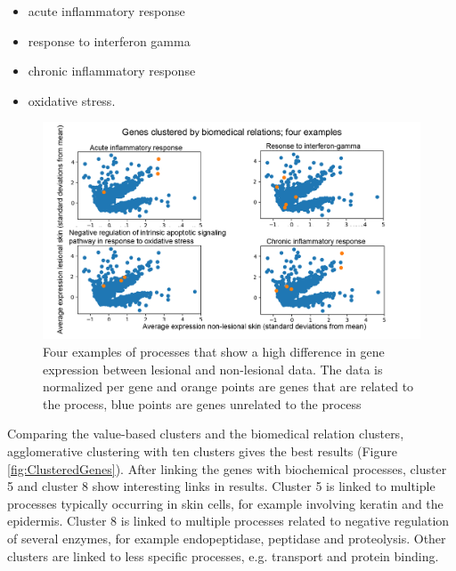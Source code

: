\documentclass[10pt,a4paper]{report}
\begin{document}
	\begin{itemize}
		\item acute inflammatory response
		\item response to interferon gamma 
		\item chronic inflammatory response
		\item oxidative stress.
	\end{itemize}
	
	\begin{figure}[H]
		\includegraphics[width=1\textwidth]{Sign_Processes_Psoriasis.png}
		\caption{Four examples of processes that show a high difference in gene expression between lesional and non-lesional data. The data is normalized per gene and orange points are genes that are related to the process, blue points are genes unrelated to the process}
		\label{fig:ProcessesScaledBySample}
	\end{figure}	
	
	Comparing the value-based clusters and the biomedical relation clusters, agglomerative clustering with ten clusters gives the best results (Figure \ref{fig:ClusteredGenes}). After linking the genes with biochemical processes, cluster 5 and cluster 8 show interesting links in results. Cluster 5 is linked to multiple processes typically occurring in skin cells, for example involving keratin and the epidermis. Cluster 8 is linked to multiple processes related to negative regulation of several enzymes, for example endopeptidase, peptidase and proteolysis. Other clusters are linked to less specific processes, e.g. transport and protein binding.
	
\end{document}
